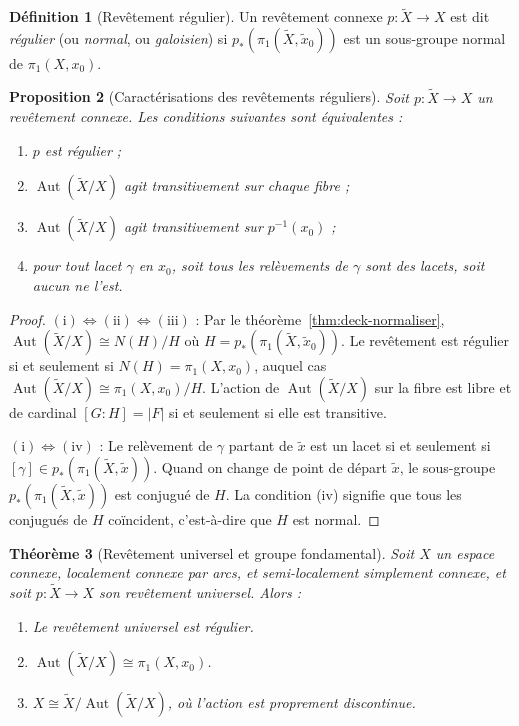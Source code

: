 \documentclass[12pt,a4paper,openany]{book}
\theoremstyle{definition}
\newtheorem{definition}{Définition}[chapter]
\theoremstyle{plain}
\newtheorem{theoreme}[definition]{Théorème}
\newtheorem{proposition}[definition]{Proposition}
\theoremstyle{remark}
\DeclareMathOperator{\Aut}{Aut}
\newcommand{\abs}[1]{\left|#1\right|}
\begin{document}
\begin{definition}[Revêtement régulier]\label{def:rev-regulier}
Un revêtement connexe $p \colon \widetilde{X} \to X$ est dit \emph{régulier}
(ou \emph{normal}, ou \emph{galoisien}) si $p_*(\pi_1(\widetilde{X}, \tilde{x}_0))$
est un sous-groupe normal de $\pi_1(X, x_0)$.
\end{definition}

\begin{proposition}[Caractérisations des revêtements réguliers]\label{prop:caract-regulier}
Soit $p \colon \widetilde{X} \to X$ un revêtement connexe. Les conditions suivantes
sont équivalentes :
\begin{enumerate}[label=(\roman*)]
\item $p$ est régulier ;
\item $\Aut(\widetilde{X}/X)$ agit transitivement sur chaque fibre ;
\item $\Aut(\widetilde{X}/X)$ agit transitivement sur $p^{-1}(x_0)$ ;
\item pour tout lacet $\gamma$ en $x_0$, soit tous les relèvements de $\gamma$ sont des lacets,
soit aucun ne l'est.
\end{enumerate}
\end{proposition}

\begin{proof}
$\mathrm{(i) \Leftrightarrow (ii) \Leftrightarrow (iii)}$ :
Par le théorème~\ref{thm:deck-normaliser}, $\Aut(\widetilde{X}/X) \cong N(H)/H$ où $H = p_*(\pi_1(\widetilde{X}, \tilde{x}_0))$.
Le revêtement est régulier si et seulement si $N(H) = \pi_1(X, x_0)$, auquel cas
$\Aut(\widetilde{X}/X) \cong \pi_1(X, x_0)/H$. L'action de $\Aut(\widetilde{X}/X)$ sur
la fibre est libre et de cardinal $[G:H] = \abs{F}$ si et seulement si elle est transitive.

$\mathrm{(i) \Leftrightarrow (iv)}$ :
Le relèvement de $\gamma$ partant de $\tilde{x}$ est un lacet si et seulement si
$[\gamma] \in p_*(\pi_1(\widetilde{X}, \tilde{x}))$. Quand on change de point de départ
$\tilde{x}$, le sous-groupe $p_*(\pi_1(\widetilde{X}, \tilde{x}))$ est conjugué de $H$.
La condition (iv) signifie que tous les conjugués de $H$ coïncident, c'est-à-dire que $H$ est normal.
\end{proof}

\begin{theoreme}[Revêtement universel et groupe fondamental]\label{thm:rev-universel-pi1}
Soit $X$ un espace connexe, localement connexe par arcs, et semi-localement simplement connexe,
et soit $p \colon \widetilde{X} \to X$ son revêtement universel. Alors :
\begin{enumerate}[label=(\roman*)]
\item Le revêtement universel est régulier.
\item $\Aut(\widetilde{X}/X) \cong \pi_1(X, x_0)$.
\item $X \cong \widetilde{X} / \Aut(\widetilde{X}/X)$, où l'action est proprement discontinue.
\end{enumerate}
\end{theoreme}
\end{document}
